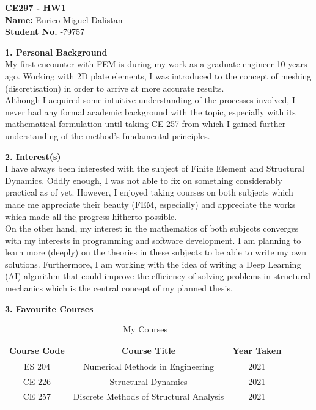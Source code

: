 \documentclass[12pt,a4paper]{article}
\begin{document}
\noindent \textbf{CE297 - HW1} \\
\textbf{Name:} \noindent Enrico Miguel Dalistan \\
\textbf{Student No.} -79757\\
\bigskip
\bigskip
\bigskip

\noindent \textbf{1. Personal Background} \\

\noindent My first encounter with FEM is during my work as a graduate engineer 10 years ago.
Working with 2D plate elements, I was introduced to the concept of meshing (discretisation)
in order to arrive at more accurate results. \\

\noindent Although I acquired some intuitive understanding of the processes involved, I never had any formal academic background with the topic, especially with its
mathematical formulation until taking CE 257 from which I gained further understanding of
the method's fundamental principles. \\
\bigskip

\noindent \textbf{2. Interest(s)}\\

\noindent I have always been interested with the subject of Finite Element and Structural Dynamics.
Oddly enough, I was not able to fix on something considerably practical as of yet. However, I enjoyed taking courses on
both subjects which made me appreciate their beauty (FEM, especially) and appreciate the works which made
all the progress hitherto possible.\\

\noindent On the other hand, my interest in the mathematics of both subjects converges with my interests
in programming and software development. I am planning to learn more (deeply) on the theories in these subjects
to be able to write my own solutions. Furthermore, I am working with the idea of writing a Deep Learning (AI)
algorithm that could improve the efficiency of solving problems in structural mechanics
which is the central concept of my planned thesis. \\
\bigskip

\noindent \textbf{3. Favourite Courses}
\begin{table} [htb]
  \begin{center}
    \caption{My Courses}
    {\begin{tabular} [t] {ccc}
        \hline
        \textbf{Course Code} & \textbf{Course Title}                   & \textbf{Year Taken} \\
        \hline
        ES 204               & Numerical Methods in Engineering        & 2021                \\
        CE 226               & Structural Dynamics                     & 2021                \\
        CE 257               & Discrete Methods of Structural Analysis & 2021                \\
      \end{tabular}}
  \end{center}
\end{table}
\end{document}

